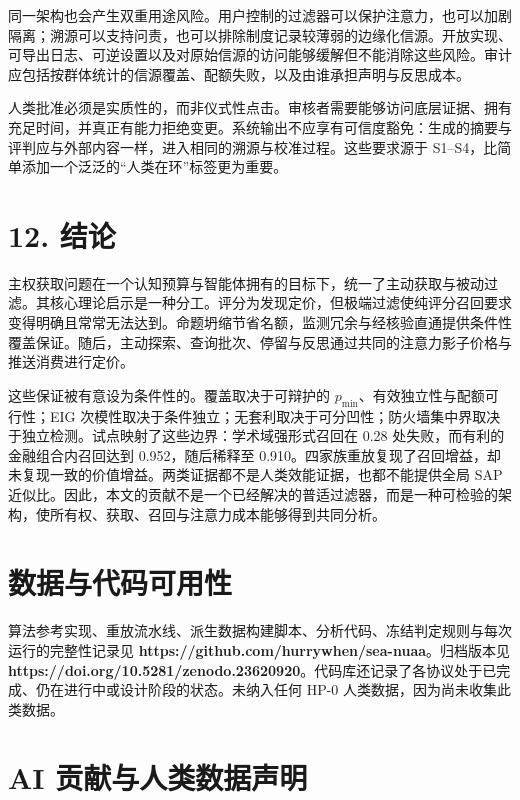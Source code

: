 \documentclass[
  chinese,
  11pt]{article}
\begin{document}
同一架构也会产生双重用途风险。用户控制的过滤器可以保护注意力，也可以加剧隔离；溯源可以支持问责，也可以排除制度记录较薄弱的边缘化信源。开放实现、可导出日志、可逆设置以及对原始信源的访问能够缓解但不能消除这些风险。审计应包括按群体统计的信源覆盖、配额失败，以及由谁承担声明与反思成本。

人类批准必须是实质性的，而非仪式性点击。审核者需要能够访问底层证据、拥有充足时间，并真正有能力拒绝变更。系统输出不应享有可信度豁免：生成的摘要与评判应与外部内容一样，进入相同的溯源与校准过程。这些要求源于 S1--S4，比简单添加一个泛泛的``人类在环''标签更为重要。

\section{12. 结论}\label{ux7ed3ux8bba}

主权获取问题在一个认知预算与智能体拥有的目标下，统一了主动获取与被动过滤。其核心理论启示是一种分工。评分为发现定价，但极端过滤使纯评分召回要求变得明确且常常无法达到。命题坍缩节省名额，监测冗余与经核验直通提供条件性覆盖保证。随后，主动探索、查询批次、停留与反思通过共同的注意力影子价格与推送消费进行定价。

这些保证被有意设为条件性的。覆盖取决于可辩护的 \(p_{\min}\)、有效独立性与配额可行性；EIG 次模性取决于条件独立；无套利取决于可分凹性；防火墙集中界取决于独立检测。试点映射了这些边界：学术域强形式召回在 0.28 处失败，而有利的金融组合内召回达到 0.952，随后稀释至 0.910。四家族重放复现了召回增益，却未复现一致的价值增益。两类证据都不是人类效能证据，也都不能提供全局 SAP 近似比。因此，本文的贡献不是一个已经解决的普适过滤器，而是一种可检验的架构，使所有权、获取、召回与注意力成本能够得到共同分析。

\section{数据与代码可用性}\label{ux6570ux636eux4e0eux4ee3ux7801ux53efux7528ux6027}

算法参考实现、重放流水线、派生数据构建脚本、分析代码、冻结判定规则与每次运行的完整性记录见 \textbf{https://github.com/hurrywhen/sea-nuaa}。归档版本见 \textbf{https://doi.org/10.5281/zenodo.23620920}。代码库还记录了各协议处于已完成、仍在进行中或设计阶段的状态。未纳入任何 HP-0 人类数据，因为尚未收集此类数据。

\section{AI 贡献与人类数据声明}\label{ai-ux8d21ux732eux4e0eux4ebaux7c7bux6570ux636eux58f0ux660e}
\end{document}
